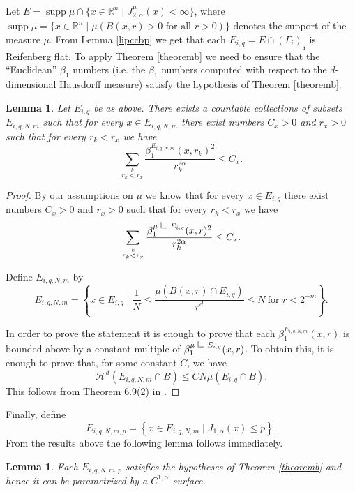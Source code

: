 \documentclass[11pt, twoside, leqno]{article}
\numberwithin{equation}{section}
\theoremstyle{plain}
\newtheorem{lem}[thm]{Lemma}
\theoremstyle{definition}
\newcommand{\R}{\mathbb{R}}
\newcommand{\res}{\hbox{ {\vrule height .22cm}{\leaders\hrule\hskip.2cm} }} %
\newcommand{\supp}{\operatorname{supp}}
\begin{document}
Let $E=\supp\mu \cap \{x \in \R^n \mid J^{\mu}_{2,\alpha}(x) < \infty\}$, where $\supp\mu=\overline{\{x \in \R^n \mid \mu(B(x,r)>0 \text { for all $r>0$})\}}$ denotes the support of the measure $\mu$. From Lemma \ref{lipccbp} we get that each $E_{i,q}=E \cap (\Gamma_i)_q$ is Reifenberg flat. To apply Theorem \ref{theoremb} we need to ensure that the ``Euclidean'' $\beta_1$ numbers (i.e. the $\beta_1$ numbers computed with respect to the $d$-dimensional Hausdorff measure) satisfy the hypothesis of Theorem \ref{theoremb}.

\begin{lem}
Let $E_{i,q}$ be as above. There exists a countable collections of subsets $E_{i, q, N, m}$ such that for every $x \in E_{i, q, N, m}$ there exist numbers $C_x>0$ and $r_x>0$ such that for every $r_k<r_x$ we have
\begin{equation}
\sum_{\stackrel{k}{r_k<r_x}}\frac{  \beta_1^{E_{i, q, N, m}}(x,r_k)^2}{r_k^{2\alpha}} \leq C_x.
\end{equation}
\end{lem}

\begin{proof}
By our assumptions on $\mu$ we know that for every $x \in E_{i, q}$ there exist numbers $C_x>0$ and $r_x>0$ such that for every $r_k<r_x$ we have
\begin{equation}
\sum_{\stackrel{k}{r_k<r_x}} \frac{  \beta_1^{\mu\res E_{i, q}}(x,r)^2}{r_k^{2\alpha}} \leq C_x.
\end{equation}

Define $E_{i, q, N, m}$ by
\begin{equation}
E_{i, q, N, m}=\left\{x \in E_{i,q} \mid  \frac{1}{N} \leq \frac{\mu(B(x,r) \cap E_{i,q})}{r^d}\leq N \ \text{for $r< 2^{-m}$}\right\}.
\end{equation}

In order to prove the statement it is enough to prove that each $\beta_1^{E_{i, q, N, m}}(x,r)$ is bounded above by a constant multiple of $\beta_1^{\mu\res E_{i, q}}(x,r)$. To obtain this, it is enough to prove that, for some constant $C$, we have 
\begin{equation}
    \mathcal{H}^d(E_{i, q,N,m}\cap B)\leq CN \mu(E_{i,q}\cap B).
\end{equation}
This follows from Theorem 6.9(2) in \cite{mattila}. 
\end{proof}

Finally, define
\begin{equation}
   E_{i,q,N,m,p}=\left\{x \in E_{i,q,N,m} \mid J_{1,\alpha}(x) \leq p\right\}.
\end{equation}
From the results above the following lemma follows immediately.
\begin{lem}
Each $E_{i,q,N,m,p}$ satisfies the hypotheses of Theorem \ref{theoremb} and hence it can be parametrized by a $C^{1,\alpha}$ surface.
\end{lem}
\end{document}
